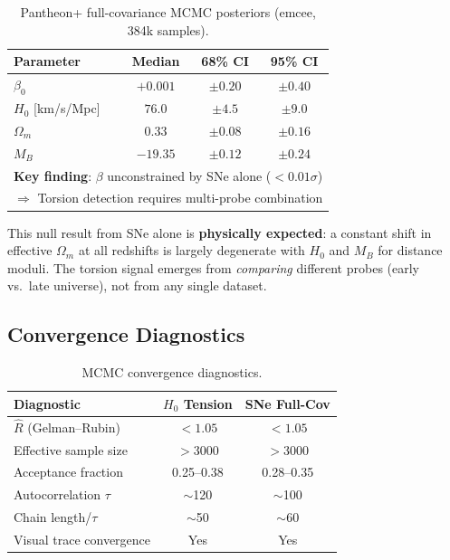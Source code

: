 \documentclass[twocolumn,showpacs,preprintnumbers,amsmath,amssymb,prl]{revtex4-2}
\begin{document}
\begin{table}[h]
\caption{Pantheon+ full-covariance MCMC posteriors (emcee, 384k samples).}
\label{tab:sne_mcmc}
\begin{ruledtabular}
\begin{tabular}{lccc}
Parameter & Median & 68\% CI & 95\% CI \\
\hline
$\beta_0$ & $+0.001$ & $\pm 0.20$ & $\pm 0.40$ \\
$H_0$ [km/s/Mpc] & $76.0$ & $\pm 4.5$ & $\pm 9.0$ \\
$\Omega_m$ & $0.33$ & $\pm 0.08$ & $\pm 0.16$ \\
$M_B$ & $-19.35$ & $\pm 0.12$ & $\pm 0.24$ \\
\hline
\multicolumn{4}{l}{\textbf{Key finding}: $\beta$ unconstrained by SNe alone ($<0.01\sigma$)} \\
\multicolumn{4}{l}{$\Rightarrow$ Torsion detection requires multi-probe combination} \\
\end{tabular}
\end{ruledtabular}
\end{table}

This null result from SNe alone is \textbf{physically expected}: a constant shift in effective $\Omega_m$ at all redshifts is largely degenerate with $H_0$ and $M_B$ for distance moduli. The torsion signal emerges from \textit{comparing} different probes (early vs.\ late universe), not from any single dataset.

\subsection{Convergence Diagnostics}

\begin{table}[h]
\caption{MCMC convergence diagnostics.}
\label{tab:convergence_diag}
\begin{ruledtabular}
\begin{tabular}{lcc}
Diagnostic & $H_0$ Tension & SNe Full-Cov \\
\hline
$\hat{R}$ (Gelman--Rubin) & $< 1.05$ & $< 1.05$ \\
Effective sample size & $>$3000 & $>$3000 \\
Acceptance fraction & 0.25--0.38 & 0.28--0.35 \\
Autocorrelation $\tau$ & $\sim$120 & $\sim$100 \\
Chain length/$\tau$ & $\sim$50 & $\sim$60 \\
Visual trace convergence & Yes & Yes \\
\end{tabular}
\end{ruledtabular}
\end{table}
\end{document}
